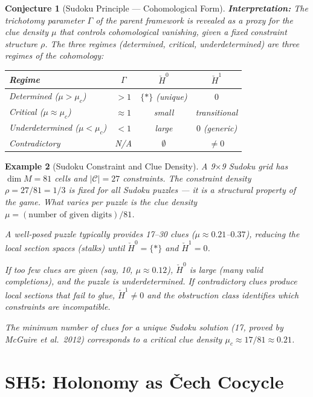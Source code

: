 \documentclass[11pt,letterpaper]{article}
\newtheorem{conjecture}{Conjecture}[section]
\newtheorem{example}[conjecture]{Example}
\newcommand{\Hcech}{\check{H}}
\newcommand{\constraint}{\mathcal{C}}
\begin{document}
\begin{conjecture}[Sudoku Principle --- Cohomological 
Form]
\textbf{Interpretation:} The trichotomy parameter $\Gamma$ of the 
parent framework is revealed as a proxy for the clue density 
$\mu$ that controls cohomological vanishing, given a fixed constraint 
structure $\rho$. The three regimes 
(determined, critical, underdetermined) are three regimes of the 
cohomology:
\begin{center}
\renewcommand{\arraystretch}{1.3}
\begin{tabular}{lccc}
\textbf{Regime} & $\Gamma$ & $\Hcech^0$ & $\Hcech^1$ \\
\hline
Determined ($\mu > \mu_c$) & $> 1$ & $\{*\}$ (unique) & $0$ \\
Critical ($\mu \approx \mu_c$) & $\approx 1$ & small & transitional \\
Underdetermined ($\mu < \mu_c$) & $< 1$ & large & $0$ (generic) \\
Contradictory & N/A & $\emptyset$ & $\neq 0$ \\
\end{tabular}
\end{center}
\end{conjecture}

\begin{example}[Sudoku Constraint and Clue Density]
A 9$\times$9 Sudoku grid has $\dim M = 81$ cells and $|\constraint| = 
27$ constraints. The constraint density $\rho = 27/81 = 1/3$ is 
\emph{fixed} for all Sudoku puzzles --- it is a structural property 
of the game. What varies per puzzle is the clue density 
$\mu = (\text{number of given digits})/81$.

A well-posed puzzle typically provides 17--30 clues 
($\mu \approx 0.21$--$0.37$), reducing the local section spaces 
(stalks) until $\Hcech^0 = \{*\}$ and $\Hcech^1 = 0$.

If too few clues are given (say, 10, $\mu \approx 0.12$), $\Hcech^0$ 
is large (many valid completions), and the puzzle is underdetermined. 
If contradictory clues produce local sections that fail to glue, 
$\Hcech^1 \neq 0$ and the obstruction class identifies which 
constraints are incompatible.

The minimum number of clues for a unique Sudoku solution (17, proved by 
McGuire et al.\ 2012) corresponds to a critical clue density 
$\mu_c \approx 17/81 \approx 0.21$.
\end{example}

\section{SH5: Holonomy as \v{C}ech Cocycle}
\end{document}
